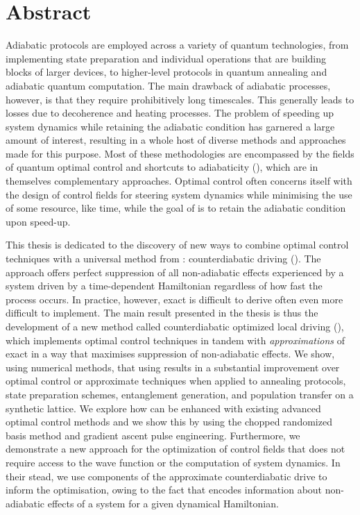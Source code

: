 \chapter{Abstract}\label{chap:abstract}

Adiabatic protocols are employed across a variety of quantum technologies, from implementing state preparation and individual operations that are building blocks of larger devices, to higher-level protocols in quantum annealing and adiabatic quantum computation. The main drawback of adiabatic processes, however, is that they require prohibitively long timescales. This generally leads to losses due to decoherence and heating processes. The problem of speeding up system dynamics while retaining the adiabatic condition has garnered a large amount of interest, resulting in a whole host of diverse methods and approaches made for this purpose. Most of these methodologies are encompassed by the fields of quantum optimal control and shortcuts to adiabaticity (), which are in themselves complementary approaches. Optimal control often concerns itself with the design of control fields for steering system dynamics while minimising the use of some resource, like time, while the goal of  is to retain the adiabatic condition upon speed-up.

This thesis is dedicated to the discovery of new ways to combine optimal control techniques with a universal method from : counterdiabatic driving (). The  approach offers perfect suppression of all non-adiabatic effects experienced by a system driven by a time-dependent Hamiltonian regardless of how fast the process occurs. In practice, however, exact  is difficult to derive often even more difficult to implement. The main result presented in the thesis is thus the development of a new method called counterdiabatic optimized local driving (), which implements optimal control techniques in tandem with \emph{approximations} of exact  in a way that maximises suppression of non-adiabatic effects. We show, using numerical methods, that using  results in a substantial improvement over optimal control or approximate  techniques when applied to annealing protocols, state preparation schemes, entanglement generation, and population transfer on a synthetic lattice. We explore how  can be enhanced with existing advanced optimal control methods and we show this by using the chopped randomized basis method and gradient ascent pulse engineering. Furthermore, we demonstrate a new approach for the optimization of control fields that does not require access to the wave function or the computation of system dynamics. In their stead, we use components of the approximate counterdiabatic drive to inform the optimisation, owing to the fact that  encodes information about non-adiabatic effects of a system for a given dynamical Hamiltonian. 